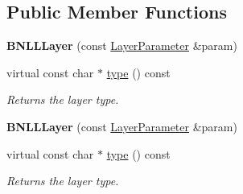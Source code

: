 \subsection*{Public Member Functions}
\begin{DoxyCompactItemize}
\item 
\mbox{\label{classcaffe_1_1_b_n_l_l_layer_ab30d4b1d22f7489597449e09d74cf4b9}} 
{\bfseries B\+N\+L\+L\+Layer} (const \mbox{\hyperlink{classcaffe_1_1_layer_parameter}{Layer\+Parameter}} \&param)
\item 
\mbox{\label{classcaffe_1_1_b_n_l_l_layer_a6a44de21163e4a9bead5bc5b2851d191}} 
virtual const char $\ast$ \mbox{\hyperlink{classcaffe_1_1_b_n_l_l_layer_a6a44de21163e4a9bead5bc5b2851d191}{type}} () const
\begin{DoxyCompactList}\small\item\em Returns the layer type. \end{DoxyCompactList}\item 
\mbox{\label{classcaffe_1_1_b_n_l_l_layer_ab30d4b1d22f7489597449e09d74cf4b9}} 
{\bfseries B\+N\+L\+L\+Layer} (const \mbox{\hyperlink{classcaffe_1_1_layer_parameter}{Layer\+Parameter}} \&param)
\item 
\mbox{\label{classcaffe_1_1_b_n_l_l_layer_a6a44de21163e4a9bead5bc5b2851d191}} 
virtual const char $\ast$ \mbox{\hyperlink{classcaffe_1_1_b_n_l_l_layer_a6a44de21163e4a9bead5bc5b2851d191}{type}} () const
\begin{DoxyCompactList}\small\item\em Returns the layer type. \end{DoxyCompactList}\end{DoxyCompactItemize}
